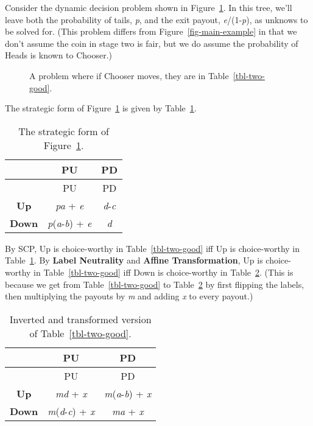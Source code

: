 \documentclass[
  10pt,
  letterpaper,
  DIV=11,
  numbers=noendperiod,
  twoside]{scrartcl}
\begin{document}
Consider the dynamic decision problem shown in
Figure~\ref{fig-two-good}. In this tree, we'll leave both the
probability of tails, \emph{p}, and the exit payout,
\emph{e}/(1-\emph{p}), as unknows to be solved for. (This problem
differs from Figure~\ref{fig-main-example} in that we don't assume the
coin in stage two is fair, but we do assume the probability of Heads is
known to Chooser.)

\begin{figure}


\caption{\label{fig-two-good}A problem where if Chooser moves, they are
in Table~\ref{tbl-two-good}.}

\end{figure}%

The strategic form of Figure~\ref{fig-two-good} is given by
Table~\ref{tbl-two-good-strategic}.

\begin{longtable}[]{@{}ccc@{}}
\caption{The strategic form of
Figure~\ref{fig-two-good}.}\label{tbl-two-good-strategic}\tabularnewline
\toprule\noalign{}
& PU & PD \\
\midrule\noalign{}
\endfirsthead
\toprule\noalign{}
& PU & PD \\
\midrule\noalign{}
\endhead
\bottomrule\noalign{}
\endlastfoot
\textbf{Up} & \emph{pa} + \emph{e} & \emph{d}-\emph{c} \\
\textbf{Down} & \emph{p}(\emph{a}-\emph{b}) + \emph{e} & \emph{d} \\
\end{longtable}

By SCP, Up is choice-worthy in Table~\ref{tbl-two-good} iff Up is
choice-worthy in Table~\ref{tbl-two-good-strategic}. By \textbf{Label
Neutrality} and \textbf{Affine Transformation}, Up is choice-worthy in
Table~\ref{tbl-two-good} iff Down is choice-worthy in
Table~\ref{tbl-two-good-inverted}. (This is because we get from
Table~\ref{tbl-two-good} to Table~\ref{tbl-two-good-inverted} by first
flipping the labels, then multiplying the payouts by \emph{m} and adding
\emph{x} to every payout.)

\begin{longtable}[]{@{}ccc@{}}
\caption{Inverted and transformed version of
Table~\ref{tbl-two-good}.}\label{tbl-two-good-inverted}\tabularnewline
\toprule\noalign{}
& PU & PD \\
\midrule\noalign{}
\endfirsthead
\toprule\noalign{}
& PU & PD \\
\midrule\noalign{}
\endhead
\bottomrule\noalign{}
\endlastfoot
\textbf{Up} & \emph{md} + \emph{x} & \emph{m}(\emph{a}-\emph{b}) +
\emph{x} \\
\textbf{Down} & \emph{m}(\emph{d}-\emph{c}) + \emph{x} & \emph{ma} +
\emph{x} \\
\end{longtable}
\end{document}
